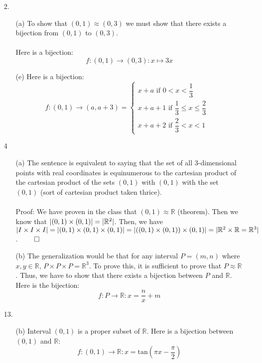 \documentclass[12pt, a4paper]{article}
\newcommand{\reals}{\mathbb{R}}
\DeclarePairedDelimiter\abs{\lvert}{\rvert}
\newcommand{\rarr}{\rightarrow}
\begin{document}
\begin{itemize}
\item[]

\item[2.]
\begin{itemize}
\item[(a)]
To show that $(0,1) \approx (0, 3)$ we must show that there exists a bijection from $(0, 1)$ to $(0, 3)$.\\\\
Here is a bijection:
$$f : (0, 1) \rarr (0, 3) : x \mapsto 3x$$

\item[(e)]
Here is a bijection:
$$f : (0, 1) \rarr (a, a + 3) = \begin{cases} x + a \mbox{ if $0 < x < \dfrac{1}{3}$}\\ x + a + 1 \mbox{ if $\dfrac{1}{3} \leq x \leq \dfrac{2}{3}$ }\\x + a + 2 \mbox{ if $\dfrac{2}{3} < x < 1$}\end{cases}$$
\end{itemize}

\item[]

\item[4]
\begin{itemize}
\item[(a)]
The sentence is equivalent to saying that the set of all 3-dimensional points with real coordinates is equinumerous
to the cartesian product of the cartesian product of the sets $(0, 1)$ with $(0, 1)$ with the set $(0, 1)$ (sort of cartesian product taken thrice).
\\\\
Proof: We have proven in the class that $(0, 1) \approx \reals$ (theorem). Then we know that $\abs{(0, 1) \times (0, 1)} = \abs{\reals^2}$.
Then, we have $\abs{I \times I \times I} = \abs{(0, 1) \times (0, 1) \times (0, 1)} = \abs{((0, 1) \times (0, 1)) \times (0, 1)} = \abs{\reals^2 \times \reals = \reals^3}$.
$\qed$
\item[(b)]
The generalization would be that for any interval $P = (m, n)$ where $x, y \in \reals$,
$P \times P \times P = \reals^3$. To prove this, it is sufficient to prove that $P \approx \reals$.
Thus, we have to show that there exists a bijection between $P$ and $\reals$.
Here is the bijection:
$$f : P \rarr \reals : x = \dfrac{n}{x} + m$$
\end{itemize}

\item[]

\item[13.]
\begin{itemize}
\item[(b)]
Interval $(0, 1)$ is a proper subset of $\reals$. Here is a bijection between $(0, 1)$ and $\reals$:
$$f : (0, 1) \rarr \reals : x = \mbox{tan}(\pi x - \dfrac{\pi}{2})$$
\end{itemize}


\end{itemize}
\end{document}
